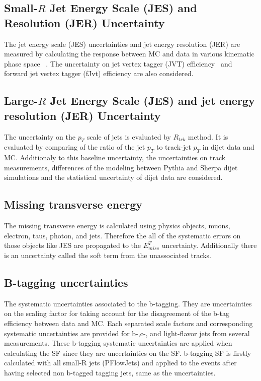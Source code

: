 \subsection{Small-$R$ Jet Energy Scale (JES) and Resolution (JER) Uncertainty}
The jet energy scale (JES) uncertainties and jet energy resolution (JER) are measured by calculating the response between MC and data in various kinematic phase space ~\cite{JetUncertainties}.
The uncertainty on jet vertex tagger (JVT) efficiency~\cite{JVTCalib} and forward jet vertex tagger (fJvt) efficiency are also considered.
\subsection{Large-$R$ Jet Energy Scale (JES) and jet energy resolution (JER) Uncertainty}
\label{sec:fatjetUncert}
The uncertainty on the $p_T$ scale of jets is evaluated by $R_{trk}$ method. It is evaluated by comparing of the ratio of the jet $p_T$ to track-jet $p_T$ in dijet data and MC.
Additionaly to this baseline uncertainty, the uncertainties on track measurements, differences of the modeling between Pythia and Sherpa dijet simulations and the statistical uncertainty of dijet data are considered.
\subsection{Missing transverse energy}
The missing transverse energy is calculated using physics objects, muons, electron, taus, photon, and jets. Therefore the all of the systematic errors on those objects like JES are propagated to the $E^T_{miss}$ uncertainty.
Additionally there is an uncertainty called the soft term from the unassociated tracks.
\subsection{B-tagging uncertainties}
The systematic uncertainties associated to the b-tagging.
They are uncertainties on the scaling factor for taking account for the disagreement of the b-tag efficiency between data and MC. Each separated scale factors and corresponding systematic uncertainties are provided for b-,c-, and light-flavor jets from several measurements.
These b-tagging systematic uncertainties are applied when calculating the SF since they are uncertainties on the SF. b-tagging SF is firstly calculated with all small-R jets (PFlowJets) and applied to the events after having selected non b-tagged tagging jets, same as the uncertainties. 

